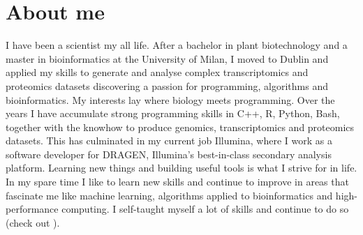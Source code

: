 \section{About me}
I have been a scientist my all life. After a bachelor in plant biotechnology
and a master in bioinformatics at the University of Milan, I moved to Dublin
and applied my skills to generate and analyse complex transcriptomics and
proteomics datasets discovering a passion for programming, algorithms and
bioinformatics. My interests lay where biology meets programming. Over the
years I have accumulate strong programming skills in C++, R, Python, Bash,
together with the knowhow to produce genomics, transcriptomics and proteomics
datasets. This has culminated in my current job Illumina, where I work as a
software developer for DRAGEN, Illumina's best-in-class secondary analysis
platform. Learning new things and building useful tools is what I strive for
in life. In my spare time I like to learn new skills and continue to improve
in areas that fascinate me like machine learning, algorithms applied to
bioinformatics and high-performance computing. I self-taught myself a lot of
skills and continue to do so (check out \textcolor{blue}{{}}).
